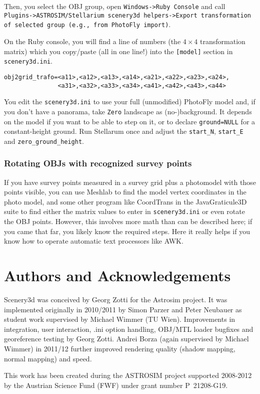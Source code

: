 \documentclass[a4paper]{article}
\newcommand{\filename}[1]{\texttt{#1}}
\newcommand{\cmd}[1]{\texttt{#1}}
\begin{document}
Then, you select the OBJ group, open \cmd{Windows->Ruby Console} and call
\cmd{Plugins->ASTROSIM/Stellarium scenery3d helpers->Export transformation
of selected group (e.g., from PhotoFly import)}.

On the Ruby console, you will find a line of numbers (the $4\times4$ transformation matrix) which you
copy/paste (all in one line!) into the \filename{[model]} section in \filename{scenery3d.ini}. 
\begin{verbatim}
obj2grid_trafo=<a11>,<a12>,<a13>,<a14>,<a21>,<a22>,<a23>,<a24>,
               <a31>,<a32>,<a33>,<a34>,<a41>,<a42>,<a43>,<a44>
\end{verbatim}
You edit the \filename{scenery3d.ini} to use your full (unmodified)
PhotoFly model and, if you don't have a panorama, take \filename{Zero}
landscape as (no-)background. It depends on the model if you want to
be able to step on it, or to declare \verb|ground=NULL| for a
constant-height ground. Run Stellarum once and adjust the
\verb|start_N|, \verb|start_E| and \verb|zero_ground_height|.

\subsubsection{Rotating OBJs with recognized survey points}
\label{sec:RotatingOBJ}


If you have survey points measured in a survey grid plus a photomodel
with those points visible, you can use Meshlab to find the model
vertex coordinates in the photo model, and some other program like
CoordTrans in the JavaGraticule3D suite to find either the matrix
values to enter in \filename{scenery3d.ini} or even rotate the OBJ
points. However, this involves more math than can be described here;
if you came that far, you likely know the required steps.  Here it
really helps if you know how to operate automatic text processors like
AWK.

\section*{Authors and Acknowledgements}
\label{Acknowledgments}


Scenery3d was conceived by Georg Zotti for the Astrosim project. It
was implemented originally in 2010/2011 by Simon Parzer and Peter
Neubauer as student work supervised by Michael Wimmer (TU
Wien). Improvements in integration, user interaction, .ini option
handling, OBJ/MTL loader bugfixes and georeference testing by Georg
Zotti. Andrei Borza (again supervised by Michael Wimmer) in 2011/12
further improved rendering quality (shadow mapping, normal mapping) and speed.

This work has been created during the ASTROSIM project supported
2008-2012 by the Austrian Science Fund (FWF) under grant number
P~21208-G19. 
\end{document}

